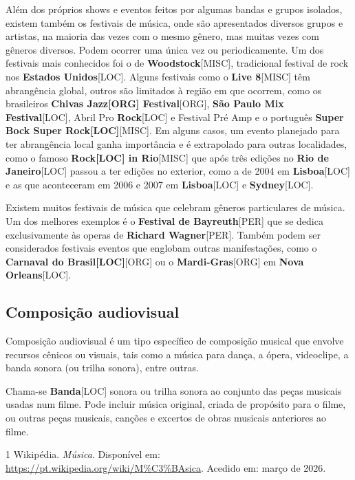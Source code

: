 \documentclass[a4paper,12pt]{article}
\begin{document}
Além dos próprios shows e eventos feitos por algumas bandas e grupos isolados, existem também os festivais de música, onde são apresentados diversos grupos e artistas, na maioria das vezes com o mesmo gênero, mas muitas vezes com gêneros diversos. Podem ocorrer uma única vez ou periodicamente. Um dos festivais mais conhecidos foi o de \textbf{Woodstock}\textsc{[MISC]}, tradicional festival de rock nos \textbf{Estados Unidos}\textsc{[LOC]}. Alguns festivais como o \textbf{Live 8}\textsc{[MISC]} têm abrangência global, outros são limitados à região em que ocorrem, como os brasileiros \textbf{Chivas \textbf{Jazz}\textsc{[ORG]} Festival}\textsc{[ORG]}, \textbf{São Paulo Mix Festival}\textsc{[LOC]}, Abril Pro \textbf{Rock}\textsc{[LOC]} e Festival Pré Amp e o português \textbf{Super Bock Super \textbf{Rock}\textsc{[LOC]}}\textsc{[MISC]}. Em alguns casos, um evento planejado para ter abrangência local ganha importância e é extrapolado para outras localidades, como o famoso \textbf{\textbf{Rock}\textsc{[LOC]} in Rio}\textsc{[MISC]} que após três edições no \textbf{Rio de Janeiro}\textsc{[LOC]} passou a ter edições no exterior, como a de 2004 em \textbf{Lisboa}\textsc{[LOC]} e as que aconteceram em 2006 e 2007 em \textbf{Lisboa}\textsc{[LOC]} e \textbf{Sydney}\textsc{[LOC]}.

Existem muitos festivais de música que celebram gêneros particulares de música. Um dos melhores exemplos é o \textbf{Festival de Bayreuth}\textsc{[PER]} que se dedica exclusivamente às operas de \textbf{Richard Wagner}\textsc{[PER]}. Também podem ser considerados festivais eventos que englobam outras manifestações, como o \textbf{Carnaval do \textbf{Brasil}\textsc{[LOC]}}\textsc{[ORG]} ou o \textbf{Mardi-Gras}\textsc{[ORG]} em \textbf{Nova Orleans}\textsc{[LOC]}.

\subsection*{Composição audiovisual}
Composição audiovisual é um tipo específico de composição musical que envolve recursos cênicos ou visuais, tais como a música para dança, a ópera, videoclipe, a banda sonora (ou trilha sonora), entre outras.

Chama-se \textbf{Banda}\textsc{[LOC]} sonora ou trilha sonora ao conjunto das peças musicais usadas num filme. Pode incluir música original, criada de propósito para o filme, ou outras peças musicais, canções e excertos de obras musicais anteriores ao filme.


\begin{thebibliography}{1}
Wikipédia.
\textit{Música}.
Disponível em: \url{https://pt.wikipedia.org/wiki/M\%C3\%BAsica}.
Acedido em: março de 2026.
\end{thebibliography}
\end{document}
